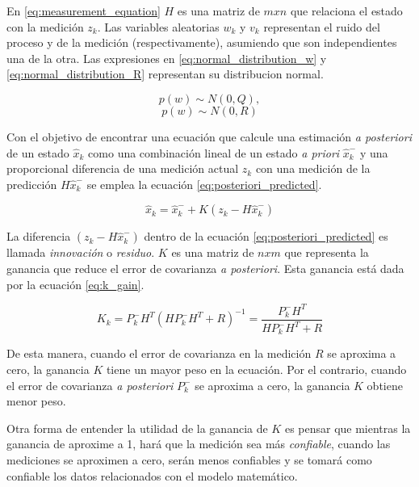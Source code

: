 En \ref{eq:measurement_equation} $H$ es una matriz de $mxn$ que relaciona el estado con la medición $z_k$.  Las variables aleatorias $w_k$ y $v_k$ representan el ruido del proceso y de la medición (respectivamente), asumiendo que son independientes una de la otra. Las expresiones en \ref{eq:normal_distribution_w} y \ref{eq:normal_distribution_R} representan su distribucion normal.

\begin{equation}
p(w) \sim N(0,Q),
\label{eq:normal_distribution_w}
\end{equation}
\begin{equation}
p(w) \sim N(0,R)
\label{eq:normal_distribution_R}
\end{equation}

Con el objetivo de encontrar una ecuación que calcule una estimación \textit{a posteriori} de un estado $\hat{x}_k$ como una combinación lineal de un estado \textit{a priori} $\hat{x}_k^-$ y una proporcional diferencia de una medición actual $z_k$ con una medición de la predicción $H\hat{x}_k^-$ se emplea la ecuación \ref{eq:posteriori_predicted}.

\begin{equation}
\hat{x}_k = \hat{x}_k^- + K(z_k-H\hat{x}_k^-)
\label{eq:posteriori_predicted}
\end{equation}

La diferencia $(z_k-H\hat{x}_k^-)$ dentro de la ecuación \ref{eq:posteriori_predicted} es llamada \textit{innovación} o \textit{residuo}. $K$ es una matriz de $nxm$ que representa la ganancia que reduce el error de covarianza \textit{a posteriori}. Esta ganancia está dada por la ecuación \ref{eq:k_gain}.

\begin{equation}
K_k = P_k^-H^T(HP_k^-H^T+R)^{-1} = \frac{P_k^-H^T}{HP_k^-H^T+R}
\label{eq:k_gain}
\end{equation}

De esta manera, cuando el error de covarianza en la medición $R$ se aproxima a cero, la ganancia $K$  tiene un mayor peso en la ecuación. Por el contrario, cuando el error de covarianza \textit{a posteriori} $P_k^-$ se aproxima a cero, la ganancia $K$ obtiene menor peso. 

Otra forma de entender la utilidad de la ganancia de $K$ es pensar que mientras la ganancia de aproxime a 1, hará que la medición sea más \textit{confiable}, cuando las mediciones se aproximen a cero, serán menos confiables y se tomará como confiable los datos relacionados con el modelo matemático.
